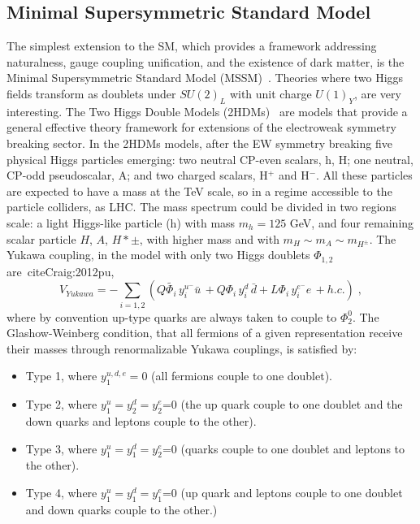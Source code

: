 \subsection*{Minimal Supersymmetric Standard Model} The simplest extension to the SM, which provides a
framework addressing naturalness, gauge coupling unification, and the existence of
dark matter, is the Minimal Supersymmetric Standard Model (MSSM)~\cite{FAYET1976159}.
Theories where two Higgs fields transform as doublets under $SU(2)_L$ with unit charge $U(1)_Y$, are very interesting. 
The Two Higgs Double Models (2HDMs)~\cite{Barroso:2013zxa} are models that provide
a general effective theory framework for extensions of the electroweak symmetry
breaking sector. In the 2HDMs models, after the EW  symmetry breaking five physical Higgs  particles emerging: 
two neutral CP-even scalars, h, H; one neutral, CP-odd pseudoscalar, A; and two charged scalars, H$^{+}$ and H$^{-}$. All these particles are expected to have a mass at the TeV scale, so in a regime accessible to the particle colliders, as LHC.
The mass spectrum could be divided  in two regions scale: a light Higgs-like particle (h) with mass $m_h= 125$ GeV, and four remaining scalar particle $H$, $A$, $H*{\pm}$, with higher mass and with $m_H \sim m_A \sim m_{H^{\pm}}$.
The Yukawa coupling, in the model with only two Higgs doublets $\Phi_{1,2}$ are~cite{Craig:2012pu},
 \begin{equation}
V_{Yukawa}= - \sum_{i=1,2} (Q \tilde{\Phi_i} \, y_i^{u^{-}}  \bar{u} \, + Q \Phi_i \, y_i^{d} \, \bar{d} + L \Phi_i \, y_i^{e^{-}} e \, + h.c.  )   \; , \end{equation}
where
by convention up-type quarks are always taken to couple to $\Phi_2^0$.
The Glashow-Weinberg condition, that all fermions of a given representation receive their masses through renormalizable
Yukawa couplings, is satisfied by:
\begin{itemize}
\item Type 1, where $y_1^{u,d,e}=0$  (all fermions couple to one doublet).
\item Type 2, where $y_1^u=y_2^d= y_2^e$=0 (the up quark couple to one doublet and the down quarks and leptons couple to the other).
\item Type 3, where $y_1^u=y_1^d= y_2^e$=0 (quarks couple to one doublet and leptons to the other).
\item Type 4, where $y_1^u=y_1^d= y_1^e$=0 (up quark and leptons couple to one doublet and down quarks couple to the other.)
\end{itemize}

